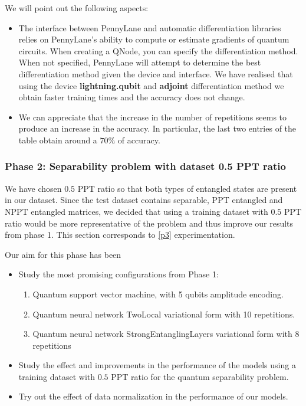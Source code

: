 We will point out the following aspects:
\begin{itemize}
    \item The interface between PennyLane and automatic differentiation libraries relies on PennyLane’s ability to compute or estimate gradients of quantum circuits. When creating a QNode, you can specify the differentiation method.  When not specified, PennyLane will attempt to determine the best differentiation method given the device and interface. We have realised that using the device \textbf{lightning.qubit} and \textbf{adjoint} differentiation method we obtain faster training times and the accuracy does not change.
    \item We can appreciate that the increase in the number of repetitions seems to produce an increase in the accuracy. In particular, the last two entries of the table obtain around a $70\%$ of accuracy. 
\end{itemize}

\subsubsection{Phase 2: Separability problem with dataset 0.5 PPT ratio}

We have chosen $0.5$ PPT ratio so that both types of entangled states are present in our dataset. Since the test dataset contains separable, PPT entangled and NPPT entangled matrices, we decided that using a training dataset with $0.5$ PPT ratio would be more representative of the problem and thus improve our results from phase 1. This section corresponds to \autoref{p3} experimentation.

Our aim for this phase has been
\begin{itemize}
    \item Study the most promising configurations from Phase 1: 
    \begin{enumerate}
        \item Quantum support vector machine, with 5 qubits amplitude encoding.
        \item Quantum neural network TwoLocal variational form with 10 repetitions.
        \item Quantum neural network StrongEntanglingLayers variational form with 8 repetitions
    \end{enumerate}
    \item Study the effect and improvements in the performance of the models using a training dataset with $0.5$ PPT ratio for the quantum separability problem.
    \item Try out the effect of data normalization in the performance of our models.
\end{itemize}

